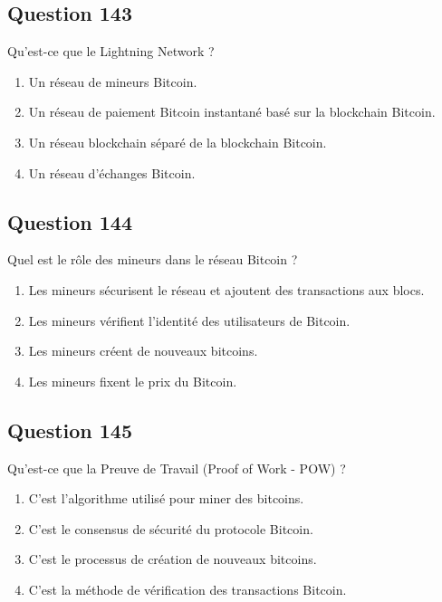 \documentclass[12pt,a4paper]{article}
\begin{document}
\subsection*{Question 143}
Qu'est-ce que le Lightning Network ?

\begin{enumerate}[label=\Alph*., leftmargin=*]
\item Un réseau de mineurs Bitcoin.
\item Un réseau de paiement Bitcoin instantané basé sur la blockchain Bitcoin.
\item Un réseau blockchain séparé de la blockchain Bitcoin.
\item Un réseau d'échanges Bitcoin.
\end{enumerate}

\bigskip


\subsection*{Question 144}
Quel est le rôle des mineurs dans le réseau Bitcoin ?

\begin{enumerate}[label=\Alph*., leftmargin=*]
\item Les mineurs sécurisent le réseau et ajoutent des transactions aux blocs.
\item Les mineurs vérifient l'identité des utilisateurs de Bitcoin.
\item Les mineurs créent de nouveaux bitcoins.
\item Les mineurs fixent le prix du Bitcoin.
\end{enumerate}

\bigskip


\subsection*{Question 145}
Qu'est-ce que la Preuve de Travail (Proof of Work - POW) ?

\begin{enumerate}[label=\Alph*., leftmargin=*]
\item C'est l'algorithme utilisé pour miner des bitcoins.
\item C'est le consensus de sécurité du protocole Bitcoin.
\item C'est le processus de création de nouveaux bitcoins.
\item C'est la méthode de vérification des transactions Bitcoin.
\end{enumerate}
\end{document}
